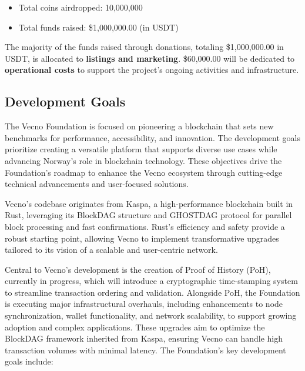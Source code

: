 \documentclass[a4paper,onecolumn,superscriptaddress,10pt]{compositionalityarticle}
\begin{document}
\vspace{1cm}

\begin{itemize}
    \item Total coins airdropped: 10,000,000
    \item Total funds raised: \$1,000,000.00 (in USDT)
\end{itemize}

\vspace{0.5cm}

The majority of the funds raised through donations, totaling \$1,000,000.00 in USDT, is allocated to \textbf{listings and marketing}. \$60,000.00 will be dedicated to \textbf{operational costs} to support the project's ongoing activities and infrastructure.

\subsection{Development Goals}\label{sec2.4}

The Vecno Foundation is focused on pioneering a blockchain that sets new benchmarks for performance, accessibility, and innovation. The development goals prioritize creating a versatile platform that supports diverse use cases while advancing Norway’s role in blockchain technology. These objectives drive the Foundation’s roadmap to enhance the Vecno ecosystem through cutting-edge technical advancements and user-focused solutions.

Vecno’s codebase originates from Kaspa, a high-performance blockchain built in Rust, leveraging its BlockDAG structure and GHOSTDAG protocol for parallel block processing and fast confirmations. Rust’s efficiency and safety provide a robust starting point, allowing Vecno to implement transformative upgrades tailored to its vision of a scalable and user-centric network.

Central to Vecno’s development is the creation of Proof of History (PoH), currently in progress, which will introduce a cryptographic time-stamping system to streamline transaction ordering and validation. Alongside PoH, the Foundation is executing major infrastructural overhauls, including enhancements to node synchronization, wallet functionality, and network scalability, to support growing adoption and complex applications. These upgrades aim to optimize the BlockDAG framework inherited from Kaspa, ensuring Vecno can handle high transaction volumes with minimal latency. The Foundation’s key development goals include:
\end{document}

